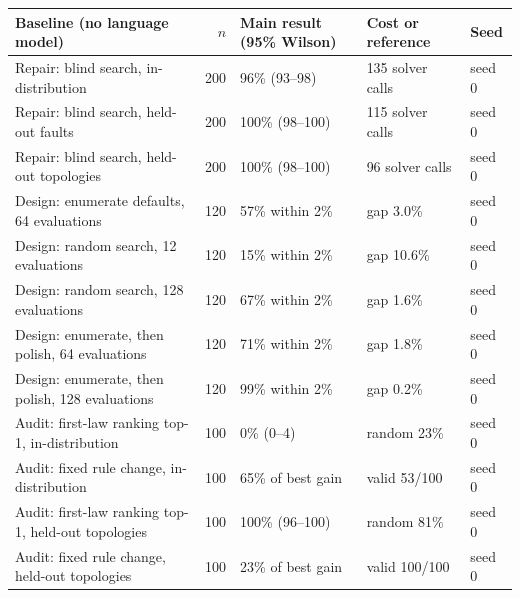 \begingroup\scriptsize\renewcommand{\arraystretch}{1.15}
\begin{tabular}{@{}p{5.7cm}rp{3.1cm}p{3.1cm}l@{}}
\toprule
Baseline (no language model) & $n$ & Main result (95\% Wilson) & Cost or reference & Seed \\
\midrule
Repair: blind search, in-distribution & 200 & 96\% (93--98) & 135 solver calls & seed 0 \\
Repair: blind search, held-out faults & 200 & 100\% (98--100) & 115 solver calls & seed 0 \\
Repair: blind search, held-out topologies & 200 & 100\% (98--100) & 96 solver calls & seed 0 \\
Design: enumerate defaults, 64 evaluations & 120 & 57\% within 2\% & gap 3.0\% & seed 0 \\
Design: random search, 12 evaluations & 120 & 15\% within 2\% & gap 10.6\% & seed 0 \\
Design: random search, 128 evaluations & 120 & 67\% within 2\% & gap 1.6\% & seed 0 \\
Design: enumerate, then polish, 64 evaluations & 120 & 71\% within 2\% & gap 1.8\% & seed 0 \\
Design: enumerate, then polish, 128 evaluations & 120 & 99\% within 2\% & gap 0.2\% & seed 0 \\
Audit: first-law ranking top-1, in-distribution & 100 & 0\% (0--4) & random 23\% & seed 0 \\
Audit: fixed rule change, in-distribution & 100 & 65\% of best gain & valid 53/100 & seed 0 \\
Audit: first-law ranking top-1, held-out topologies & 100 & 100\% (96--100) & random 81\% & seed 0 \\
Audit: fixed rule change, held-out topologies & 100 & 23\% of best gain & valid 100/100 & seed 0 \\
\bottomrule
\end{tabular}\endgroup
